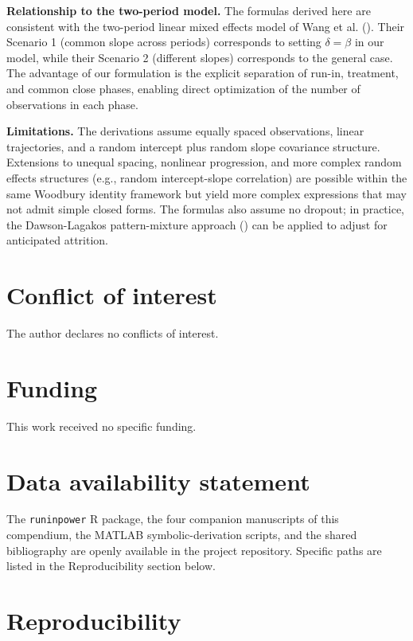 \documentclass[
  11pt,
]{article}
\begin{document}
\textbf{Relationship to the two-period model.} The formulas derived here
are consistent with the two-period linear mixed effects model of Wang et
al. (). Their Scenario 1
(common slope across periods) corresponds to setting \(\delta = \beta\)
in our model, while their Scenario 2 (different slopes) corresponds to
the general case. The advantage of our formulation is the explicit
separation of run-in, treatment, and common close phases, enabling
direct optimization of the number of observations in each phase.

\textbf{Limitations.} The derivations assume equally spaced
observations, linear trajectories, and a random intercept plus random
slope covariance structure. Extensions to unequal spacing, nonlinear
progression, and more complex random effects structures (e.g., random
intercept-slope correlation) are possible within the same Woodbury
identity framework but yield more complex expressions that may not admit
simple closed forms. The formulas also assume no dropout; in practice,
the Dawson-Lagakos pattern-mixture approach
()
can be applied to adjust for anticipated attrition.

\section{Conflict of interest}\label{conflict-of-interest}

The author declares no conflicts of interest.

\section{Funding}\label{funding}

This work received no specific funding.

\section{Data availability statement}\label{data-availability-statement}

The \texttt{runinpower} R package, the four companion manuscripts of
this compendium, the MATLAB symbolic-derivation scripts, and the shared
bibliography are openly available in the project repository. Specific
paths are listed in the Reproducibility section below.

\section{Reproducibility}\label{reproducibility}
\end{document}
